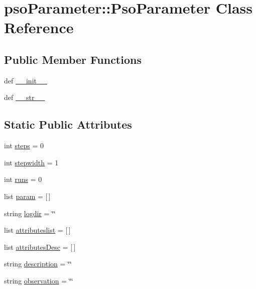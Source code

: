 \hypertarget{classpsoParameter_1_1PsoParameter}{
\section{psoParameter::PsoParameter Class Reference}
\label{classpsoParameter_1_1PsoParameter}
}
\subsection*{Public Member Functions}
\begin{CompactItemize}
\item 
def \hyperlink{classpsoParameter_1_1PsoParameter_92fb4bd52063b526b0f8e590fc79446f}{\_\-\_\-init\_\-\_\-}
\item 
def \hyperlink{classpsoParameter_1_1PsoParameter_49fdfaf70f45a0a55bdfecb622a41dd7}{\_\-\_\-str\_\-\_\-}
\end{CompactItemize}
\subsection*{Static Public Attributes}
\begin{CompactItemize}
\item 
int \hyperlink{classpsoParameter_1_1PsoParameter_1cf54a5e5ce2d1a6e3f2065ed99e47c4}{steps} = 0
\item 
int \hyperlink{classpsoParameter_1_1PsoParameter_cdf8742e38848f67713f91fe8b8e165a}{stepwidth} = 1
\item 
int \hyperlink{classpsoParameter_1_1PsoParameter_f70fbb5668ab229cfe4aa0a61f2528b2}{runs} = 0
\item 
list \hyperlink{classpsoParameter_1_1PsoParameter_bf02b64680991fd387404871a912e1a2}{param} = \mbox{[}$\,$\mbox{]}
\item 
string \hyperlink{classpsoParameter_1_1PsoParameter_eb2412dc3561e8d2a5bef8dde9fb1ec8}{logdir} = \char`\"{}\char`\"{}
\item 
list \hyperlink{classpsoParameter_1_1PsoParameter_b4d3b8e62d471c088a3ea5bfe873fced}{attributeslist} = \mbox{[}$\,$\mbox{]}
\item 
list \hyperlink{classpsoParameter_1_1PsoParameter_3178cbdb52114399fe03762520610f74}{attributesDesc} = \mbox{[}$\,$\mbox{]}
\item 
string \hyperlink{classpsoParameter_1_1PsoParameter_c42553699bf96e2c7c62acad7997dc03}{description} = \char`\"{}\char`\"{}
\item 
string \hyperlink{classpsoParameter_1_1PsoParameter_29bd5d98ba56b35a7959b5dd2b9af44c}{observation} = \char`\"{}\char`\"{}
\end{CompactItemize}


